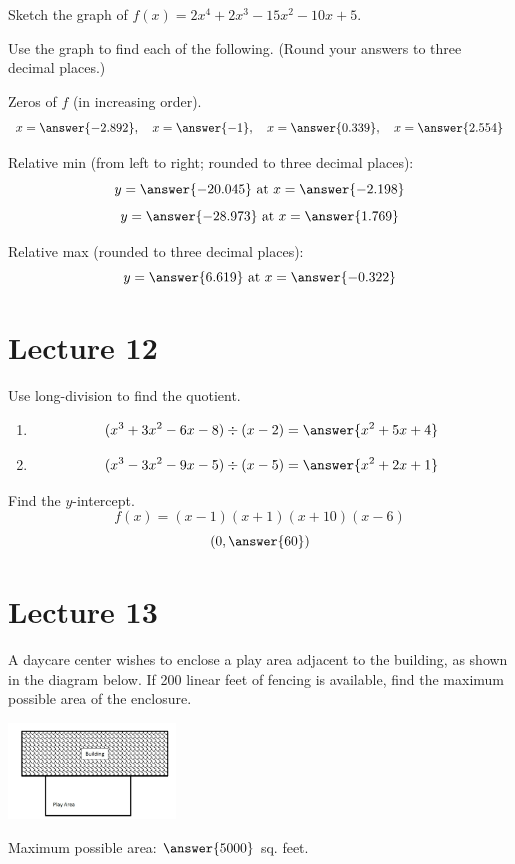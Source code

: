 \documentclass{ximera}
\begin{document}
  \begin{problem}\label{prob:160hom5prob6} 
  Sketch the graph of $f(x)=2x^4+2x^3-15x^2-10x+5$.
  \begin{center}  
\end{center}
  Use the graph to find each of the following.  (Round your answers to three decimal places.)
  
  Zeros of $f$ (in increasing order).
  $$x=\answer{-2.892},\quad x=\answer{-1},\quad x=\answer{0.339},\quad x=\answer{2.554}$$
  
  Relative min (from left to right; rounded to three decimal places):
  $$y=\answer{-20.045} \mbox{ at } x=\answer{-2.198}$$
  $$y=\answer{-28.973}\mbox{ at } x=\answer{1.769}$$
  
  Relative max (rounded to three decimal places):
  $$y=\answer{6.619}\mbox{ at } x=\answer{-0.322}$$
    \end{problem}
    
 \section{Lecture 12}   
\begin{problem}\label{prob:160hom5prob4} Use long-division to find the quotient.
\begin{enumerate}
  \item $$(x^3+3x^2-6x-8)\div (x-2)=\answer{x^2+5x+4}$$
  \item $$(x^3-3x^2-9x-5)\div (x-5)=\answer{x^2+2x+1}$$
  \end{enumerate}
  \end{problem}    
 
 \begin{problem}\label{prob:160hom5prob7}
 Find the $y$-intercept.
 $$f(x)=(x-1)(x+1)(x+10)(x-6)$$
 $$(0,\answer{60})$$
 \end{problem}
 
  \section{Lecture 13}
 
  \begin{problem}\label{prob:160hom6prob1} 
 A daycare center wishes to enclose a play area adjacent to the building, as shown in the diagram below.  If 200 linear feet of fencing is available, find the maximum possible area of the enclosure. 
 \begin{image}
   \includegraphics[height=1in]{160H6pic1.jpg}
 \end{image}
 Maximum possible area: $\answer{5000}$ sq. feet.
 \end{problem}
 
\end{document}

